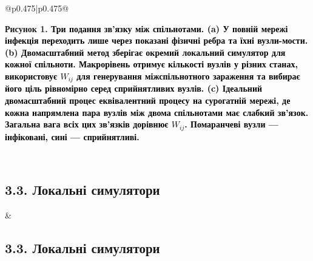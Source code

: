 \documentclass[11pt]{article}
\begin{document}
\begin{longtable}{@{}p{0.475\textwidth}|p{0.475\textwidth}@{}}
\begin{minipage}[t]{\linewidth}
\begin{minipage}{\linewidth}
\par\small\textbf{Рисунок 1. \textcolor{black}{Три подання зв'язку між спільнотами. (a) У повній мережі інфекція переходить лише через показані фізичні ребра та їхні вузли-мости. (b) Двомасштабний метод зберігає окремий локальний симулятор для кожної спільноти. Макрорівень отримує кількості вузлів у різних станах, використовує $W_{ij}$ для генерування міжспільнотного зараження та вибирає його ціль рівномірно серед сприйнятливих вузлів. (c) Ідеальний двомасштабний процес еквівалентний процесу на сурогатній мережі, де кожна напрямлена пара вузлів між двома спільнотами має слабкий зв'язок. Загальна вага всіх цих зв'язків дорівнює $W_{ij}$. Помаранчеві вузли --- інфіковані, сині --- сприйнятливі.}}

\end{minipage}\par
\end{minipage} \\[5mm]
\begin{minipage}[t]{\linewidth}
\subsection*{3.3. Локальні симулятори}

\end{minipage} &
\begin{minipage}[t]{\linewidth}
\subsection*{3.3. Локальні симулятори}


\end{minipage}
\end{longtable}
\end{document}
